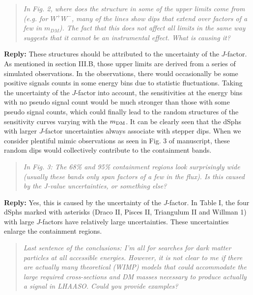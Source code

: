 \documentclass{article}
\begin{document}
\vskip 0.5cm
\begin{quote}
\emph{In Fig. 2, where does the structure in some of the upper limits come from (e.g. for $W^+W^-$, many of the lines show dips that extend over
factors of a few in $m_{DM}$). The fact that this does not affect all limits in the same way suggests that it cannot be an instrumental effect. What is causing it?}
\end{quote}

\textbf{Reply:} These structures should be attributed to the uncertainty of the $J$-factor. As mentioned in section III.B, those upper limits are derived from a series of simulated observations. In the observations, there would occasionally be some positive signals counts in some energy bins due to statistic fluctuations. Taking the uncertainty of the $J$-factor into account, the sensitivities at the energy bins with no pseudo signal count would be much stronger than those with some pseudo signal counts, which could finally lead to the random structures of the sensitivity curves varying with the $m_{\rm DM}$. It can be clearly seen that the dSphs with larger $J$-factor uncertainties always associate with stepper dips. When we consider plentiful mimic observations as seen in Fig. 3 of manuscript, these random dips would collectively contribute to the containment bands.

\vskip 0.5cm
\begin{quote}
\emph{In Fig. 3: The 68\% and 95\% containment regions look surprisingly wide (usually these bands only span factors of a few in the flux). Is this caused by the J-value uncertainties, or something else?}
\end{quote}

\textbf{Reply:} Yes, this is caused by the uncertainty of the $J$-factor. In Table I, the four dSphs marked with asterisks (Draco II, Pisces II, Triangulum II and Willman 1) with large $J$-factors have relatively large uncertainties. These uncertainties enlarge the containment regions.

\vskip 0.5cm
\begin{quote}
\emph{Last sentence of the conclusions: I'm all for searches for dark matter particles at all accessible energies. However, it is not clear to me if there are actually many theoretical (WIMP) models that could accommodate the large required cross-sections and DM masses necessary to produce actually a signal in LHAASO. Could you provide examples?}
\end{quote}
\end{document}
